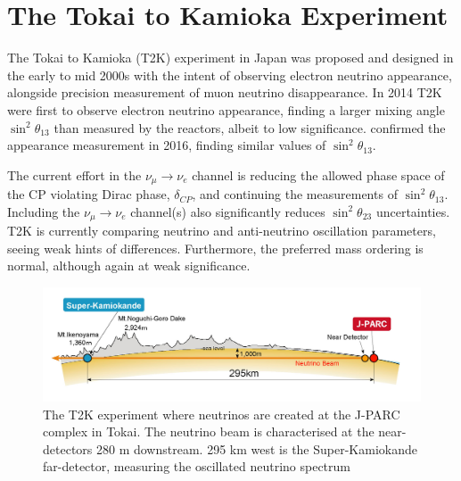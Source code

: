 \chapter{The Tokai to Kamioka Experiment}
\label{chap:detectors}
The Tokai to Kamioka (T2K) experiment in Japan was proposed and designed in the early to mid 2000s with the intent of observing electron neutrino appearance, alongside precision measurement of muon neutrino disappearance\cite{t2k_loi,t2k_prop}. In 2014 T2K were first to observe electron neutrino appearance, finding a larger mixing angle $\sin^2\theta_{13}$ than measured by the reactors\cite{t2k_disc}, albeit to low significance. \nova confirmed the appearance measurement in 2016\cite{nova_disc}, finding similar values of $\sin^2\theta_{13}$.

The current effort in the $\nu_\mu \rightarrow \nu_e$ channel is reducing the allowed phase space of the CP violating Dirac phase, $\delta_{CP}$, and continuing the measurements of $\sin^2 \theta_{13}$. Including the  $\nu_\mu \rightarrow \nu_e$ channel(s) also significantly reduces $\sin^2 \theta_{23}$ uncertainties\cite{nova_neutrino2018}. T2K is currently comparing neutrino and anti-neutrino oscillation parameters, seeing weak hints of differences. Furthermore, the preferred mass ordering is normal, although again at weak significance\cite{t2k_2017}.
\begin{figure}[h]
	\includegraphics[width=1.0\textwidth, trim={0mm 0mm 0mm 0mm}, clip,page=1]{figures/det_chap/view/t2k_overview}
	\caption{The T2K experiment where neutrinos are created at the J-PARC complex in Tokai. The neutrino beam is characterised at the near-detectors 280 m downstream. 295 km west is the Super-Kamiokande far-detector, measuring the oscillated neutrino spectrum}
	\label{fig:t2k_overview}
\end{figure}


